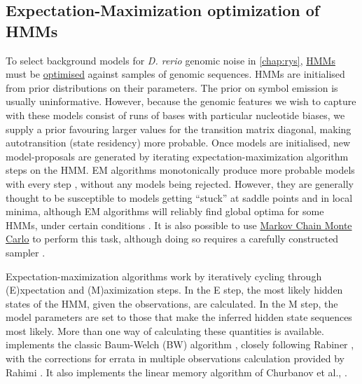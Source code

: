 \documentclass{ut-thesis}
\begin{document}
\begin{NoHyper}
\subsection{Expectation-Maximization optimization of HMMs}
\label{ssec:EM}
To select background models for \textit{D. rerio} genomic noise in \autoref{chap:rys}, \hyperref[ssec:HMM]{HMMs} must be \hyperref[ssec:MLE]{optimised} against samples of genomic sequences. HMMs are initialised from prior distributions on their parameters. The prior on symbol emission is usually uninformative. However, because the genomic features we wish to capture with these models consist of runs of bases with particular nucleotide biases, we supply a prior favouring larger values for the transition matrix diagonal, making autotransition (state residency) more probable. Once models are initialised, new model-proposals are generated by iterating expectation-maximization algorithm steps on the HMM. EM algorithms monotonically produce more probable models with every step \cite{Rabiner1989}, without any models being rejected. However, they are generally thought to be susceptible to models getting ``stuck'' at saddle points and in local minima, although EM algorithms will reliably find global optima for some HMMs, under certain conditions \cite{Yang2015b}. It is also possible to use \hyperref[ssec:MonteCarlo]{Markov Chain Monte Carlo} to perform this task, although doing so requires a carefully constructed sampler \cite{Ryden2008}.

Expectation-maximization algorithms work by iteratively cycling through (E)xpectation and (M)aximization steps. In the E step, the most likely hidden states of the HMM, given the observations, are calculated. In the M step, the model parameters are set to those that make the inferred hidden state sequences most likely. More than one way of calculating these quantities is available.  implements the classic Baum-Welch (BW) algorithm \cite{Baum1966}, closely following Rabiner \cite{Rabiner1989}, with the corrections for errata in multiple observations calculation provided by Rahimi \cite{Rahimi}. It also implements the linear memory algorithm of Churbanov et al., \cite{Churbanov2008}. 


\end{NoHyper}
\end{document}
